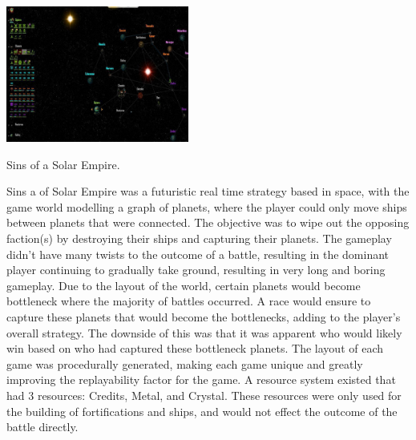 
\begin{marginfigure}
	\includegraphics[width=6cm]{res/sins/sins}
	\caption{Sins of a Solar Empire.}
	\label{fig:doom}
\end{marginfigure}

Sins a of Solar Empire was a futuristic real time strategy based in space, with the game world modelling a graph of planets, where the player could only move ships between planets that were connected. 
The objective was to wipe out the opposing faction(s) by destroying their ships and capturing their planets.
The gameplay didn't have many twists to the outcome of a battle, resulting in the dominant player continuing to gradually take ground, resulting in very long and boring gameplay.
Due to the layout of the world, certain planets would become bottleneck where the majority of battles occurred. 
A race would ensure to capture these planets that would become the bottlenecks, adding to the player's overall strategy.
The downside of this was that it was apparent who would likely win based on who had captured these bottleneck planets.
The layout of each game was procedurally generated, making each game unique and greatly improving the replayability factor for the game.
A resource system existed that had 3 resources: Credits, Metal, and Crystal. 
These resources were only used for the building of fortifications and ships, and would not effect the outcome of the battle directly.

